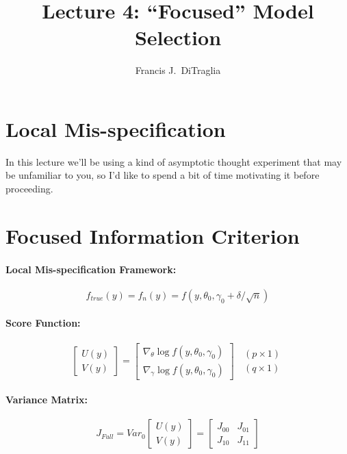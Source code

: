 \documentclass[12pt]{article}
\theoremstyle{definition}
\begin{document}
\title{Lecture 4: ``Focused'' Model Selection}

\author{Francis J.\ DiTraglia}

\maketitle 

\section{Local Mis-specification}
In this lecture we'll be using a kind of asymptotic thought experiment that may be unfamiliar to you, so I'd like to spend a bit of time motivating it before proceeding.

\section{Focused Information Criterion}


\paragraph{Local Mis-specification Framework:}
	$$f_{true}(y)=f_n(y)=f(y, \theta_0, \gamma_0 + \delta/\sqrt{n})$$

\paragraph{Score Function:}
	$$\left[\begin{array}{c}
		U(y)\\
		V(y)
\end{array} \right] = \left[\begin{array}{c}
		\nabla_\theta \log{f(y, \theta_0, \gamma_0)}\\
		\nabla_\gamma \log{f(y, \theta_0, \gamma_0)}
\end{array}\right]\;\;\begin{array}{c}
		(p\times 1)\\
		(q\times 1)
\end{array}$$

\paragraph{Variance Matrix:}
	$$J_{Full} = Var_0\left[\begin{array}{c}
		U(y)\\
		V(y)
\end{array}\right]=\left[\begin{array}{cc}
		J_{00} & J_{01}\\
		J_{10} & J_{11}
	\end{array}\right]
$$
\end{document}
